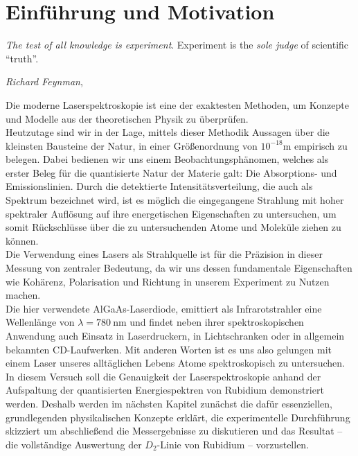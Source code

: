\chapter{Einführung und Motivation}
\label{chap:introduction}

\epigraph{\textit{The test of all knowledge is experiment}. Experiment is the \textit{sole judge} of scientific ``truth''.}{\textit{Richard Feynman}, \cite[S. 1]{feynman1964}}

\noindent Die moderne Laserspektroskopie ist eine der exaktesten Methoden, um Konzepte und Modelle aus der theoretischen Physik zu überprüfen. \\
Heutzutage sind wir in der Lage, mittels dieser Methodik Aussagen über die kleinsten Bausteine der Natur, in einer Größenordnung von $10^{-18}\text{m}$ empirisch zu belegen. Dabei bedienen wir uns einem Beobachtungsphänomen, welches als erster Beleg für die quantisierte Natur der Materie galt: Die Absorptions- und Emissionslinien. 
\noindent Durch die detektierte Intensitätsverteilung, die auch als Spektrum bezeichnet wird, ist es möglich die eingegangene Strahlung mit hoher spektraler Auflösung auf ihre energetischen Eigenschaften zu untersuchen, um somit Rückschlüsse über die zu untersuchenden Atome und Moleküle ziehen zu können.\\
\noindent Die Verwendung eines Lasers als Strahlquelle ist für die Präzision in dieser Messung von zentraler Bedeutung, da wir uns dessen fundamentale Eigenschaften wie Kohärenz, Polarisation und Richtung in unserem Experiment zu Nutzen machen.\\
\noindent Die hier verwendete AlGaAs-Laserdiode, emittiert als Infrarotstrahler eine Wellenlänge von $\lambda = \SI{780}{\nano \meter}$ und findet neben ihrer spektroskopischen Anwendung auch Einsatz in Laserdruckern, in Lichtschranken oder in allgemein bekannten CD-Laufwerken. Mit anderen Worten ist es uns also gelungen mit einem Laser unseres alltäglichen Lebens Atome spektroskopisch zu untersuchen.   \\

\noindent In diesem Versuch soll die Genauigkeit der Laserspektroskopie anhand der Aufspaltung der quantisierten Energiespektren von Rubidium demonstriert werden. Deshalb werden im nächsten Kapitel zunächst die dafür essenziellen, grundlegenden physikalischen Konzepte erklärt, die experimentelle Durchführung skizziert um abschließend die Messergebnisse zu diskutieren und das Resultat -- die vollständige Auswertung der $D_{2}$-Linie von Rubidium -- vorzustellen.\\


\cleardoublepage{}